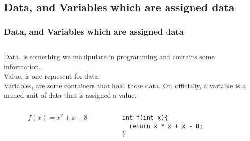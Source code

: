 \documentclass[
  11pt, %
  xcolor=dvipsnames
]{beamer}
\begin{document}
\subsection{Data, and Variables which are assigned data}

\begin{frame}[fragile]
	\frametitle{Data, and Variables which are assigned data}


	\begin{columns}[c]
		\begin{column}{0.9\textwidth}

			Data, is something we manipulate in programming and contains some information.\\

			Value, is one represent for data.\\

			Variables, are some containers that hold those data.
			Or, officially, a variable is a named unit of data that is assigned a value.

			\begin{columns}[c]
				\begin{column}{0.5\textwidth}
					\[
						f(x) = x^2 + x - 8
					\]
				\end{column}
				\begin{column}{0.5\textwidth}
					\begin{lstlisting}[style=Java]
int f(int x){
  return x * x + x - 8;
}
          \end{lstlisting}


\end{column}
\end{columns}
\end{column}
\end{columns}
\end{frame}
\end{document}
